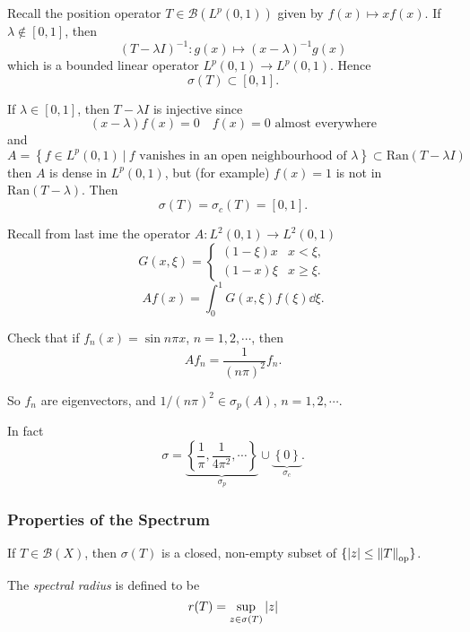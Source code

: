 \documentclass[a4paper,11pt]{article}
\begin{document}
	\begin{ex}
		Recall the position operator $T \in \mathcal{B}\left(L^p(0,1)\right)$ given by $f(x) \mapsto xf(x)$. If $\lambda \not \in [0,1]$, then
		\[
			(T - \lambda I)^{-1} : g(x) \mapsto (x-\lambda)^{-1} g(x)
		\]
		which is a bounded linear operator $L^p(0,1) \to L^p(0,1)$. Hence 
		\[
			\sigma(T) \subset [0,1].
		\]
		
		If $\lambda \in [0,1]$, then $T - \lambda I$ is injective since 
		\[
			(x- \lambda) f(x) = 0  \quad f(x) = 0 \text{ almost everywhere}
		\]
		and 
		\[
			A = \left\{ f \in L^p(0,1)\ |\ f \text{ vanishes in an open neighbourhood of }\lambda \right\} \subset \text{Ran}(T - \lambda I)
		\]
		then $A$ is dense in $L^p(0,1)$, but (for example) $f(x) = 1$ is not in $\text{Ran}(T - \lambda)$. Then
		\[
			\sigma(T) = \sigma_c(T) = [0,1].
		\]
	\end{ex}

	\begin{ex}
		Recall from last ime the operator $A : L^2(0,1) \to L^2(0,1)$
		\[
			G(x,\xi) = \begin{cases}
				(1-\xi)x & x < \xi,\\
				(1-x)\xi & x \geq \xi.
			\end{cases}
		\]
		\[
			A f (x) = \int_{0}^{1}G(x,\xi) f(\xi) \dd{\xi}.
		\]
		\begin{exer}
			Check that if $f_n(x) = \sin n \pi x$, $n = 1,2,\cdots$, then 
			\[
				A f_n = \frac{1}{(n \pi)^2} f_n.
			\]
		\end{exer}
		So $f_n$ are eigenvectors, and $1/(n \pi)^2 \in \sigma_p(A)$, $n = 1,2,\cdots$. 

		In fact 
		\[
			\sigma =  \underbrace{\left\{ \frac{1}{\pi}, \frac{1}{4 \pi^2}, \cdots \right\}}_{\sigma_p} \cup \underbrace{\left\{ 0 \right\}}_{\sigma_c}.
		\]
	\end{ex}
	
	\subsubsection*{Properties of the Spectrum}
	If $T \in \mathcal{B}(X)$, then $\sigma(T)$ is a closed, non-empty subset of $\{ \abs{z} \leq \norm{T}_{\text{op}}\}$. 

	The \emph{spectral radius} is defined to be 
	\[
		r(T) = \sup _{z \in \sigma(T)} \abs{z}
	\]
\end{document}
